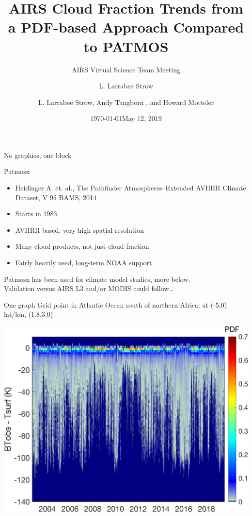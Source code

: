 \documentclass[10pt,t]{beamer}
\author{L. Larrabee Strow}
\date{\today}
\title{\large AIRS Cloud Fraction Trends from a PDF-based Approach Compared to PATMOS}
\subtitle{\footnotesize{AIRS Virtual Science Team Meeting}}
\date{\vspace{0.1in}\footnotesize{May 12, 2019 \vfill}}
\author{L. Larrabee Strow\inst{1,2}, Andy Tangborn \inst{2}, and Howard Motteler\inst{2} }
\institute[UMBC]{\inst{1} UMBC Physics Dept. \and \inst{2}UMBC JCET}
\begin{document}
\maketitle

\begin{frame}[label={sec:org80ad0c8}]{No graphics, one block}
\begin{block}{Patmosx}
\begin{itemize}
\item Heidinger A. et. al., The Pathfinder Atmospheres–Extended AVHRR Climate Dataset, V 95  BAMS, 2014
\item Starts in 1983
\item AVHRR based, very high spatial resolution
\item Many cloud products, not just cloud fraction
\item Fairly heavily used, long-term NOAA support
\end{itemize}

Patmosx has been used for climate model studies, more below.   \\

Validation versus AIRS L3 and/or MODIS could follow\ldots{}
\end{block}
\end{frame}

\begin{frame}[label={sec:org6169a6e}]{One graph}
Grid point in Atlantic Ocean south of northern Africa: at (-5,0)\textdegree{} lat/lon, (1.8,3.0)\textdegree{}

\begin{center}
\includegraphics[width=0.8\linewidth]{./Figs/airs_pdf_bin_0long_m5deglat_windchan.png}
\end{center}
\end{frame}
\end{document}
